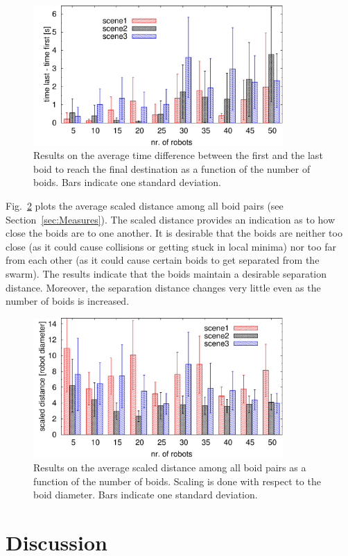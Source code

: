 \documentclass{llncs}
\begin{document}
\begin{figure}
\centering
\includegraphics[width=0.85\textwidth]{figResFL}
\caption{Results on the average time difference between the first and
  the last boid to reach the
  final destination as a function of the number of boids. Bars
  indicate one standard deviation.}
\label{fig:ResFL}
\end{figure}

Fig.~\ref{fig:ResD} plots the average scaled distance among all boid
pairs (see Section~\ref{sec:Measures}). The scaled distance provides
an indication as to how close the boids are to one another. It is
desirable that the boids are neither too close (as it could cause
collisions or getting stuck in local minima) nor too far from each
other (as it could cause certain boids to get separated from the
swarm). The results indicate that the boids maintain a desirable
separation distance. Moreover, the separation distance changes very
little even as the number of boids is increased.


\begin{figure}
\centering
\includegraphics[width=0.85\textwidth]{figResD}
\caption{Results on the average scaled distance among all boid pairs
  as a function of the number of boids. Scaling is done with respect
  to the boid diameter. Bars
  indicate one standard deviation.}
\label{fig:ResD}
\end{figure}

\section{Discussion}



\end{document}
